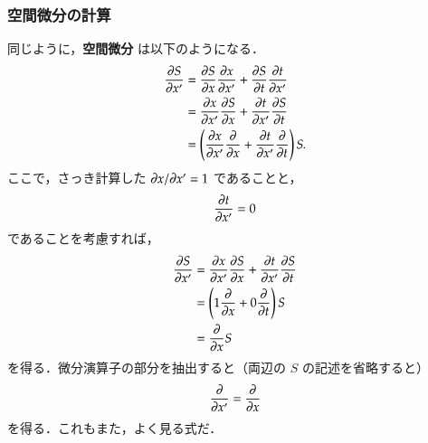             \subsubsection{空間微分の計算}
                同じように，\textbf{空間微分} は以下のようになる．
                    \begin{align*}
                        \frac{\partial S }{\partial x'} &=   \frac{\partial S }{\partial x } \frac{\partial x }{\partial x'}
                                                + \frac{\partial S }{\partial t } \frac{\partial t }{\partial x'} \\
                                              &=   \frac{\partial x }{\partial x'} \frac{\partial S }{\partial x }
                                                + \frac{\partial t }{\partial x'} \frac{\partial S }{\partial t } \\
                                              &=   \left(
                                                  \frac{\partial x }{\partial x'} \frac{\partial   }{\partial x }
                                                + \frac{\partial t }{\partial x'} \frac{\partial   }{\partial t }
                                                  \right) S.
                    \end{align*}
                ここで，さっき計算した $\partial x/\partial x' = 1$ であることと，
                        \begin{align*}
                            \frac{\partial t }{\partial x'} = 0
                        \end{align*}
                であることを考慮すれば，
                        \begin{align*}
                            \frac{\partial S }{\partial x'} &=   \frac{\partial x }{\partial x'} \frac{\partial S }{\partial x }
                                                    + \frac{\partial t }{\partial x'} \frac{\partial S }{\partial t } \\
                                                  &=   \left(
                                                      1 \frac{\partial   }{\partial x }
                                                    + 0 \frac{\partial   }{\partial t }
                                                      \right) S \\
                                                  &= \frac{\partial   }{\partial x } S
                        \end{align*}
                を得る．微分演算子の部分を抽出すると（両辺の $S$ の記述を省略すると）
                        \begin{align}
                            \frac{\partial   }{\partial x'} =  \frac{\partial   }{\partial x }
                        \end{align}
                を得る．これもまた，よく見る式だ．

